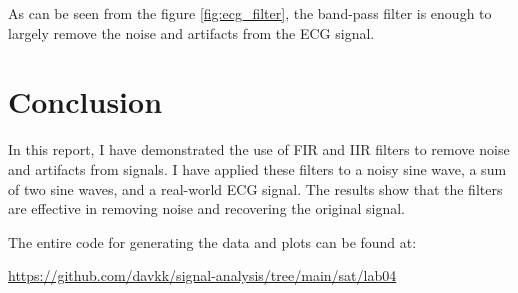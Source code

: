 \documentclass[13pt,a4paper]{article}
\begin{document}
As can be seen from the figure \ref{fig:ecg_filter}, the band-pass filter is enough to largely remove the noise and artifacts from the ECG signal.

\section{Conclusion}

In this report, I have demonstrated the use of FIR and IIR filters to remove noise and artifacts from signals. I have applied these filters to a noisy sine wave, a sum of two sine waves, and a real-world ECG signal. The results show that the filters are effective in removing noise and recovering the original signal.

The entire code for generating the data and plots can be found at:

\url{https://github.com/davkk/signal-analysis/tree/main/sat/lab04}
\end{document}

